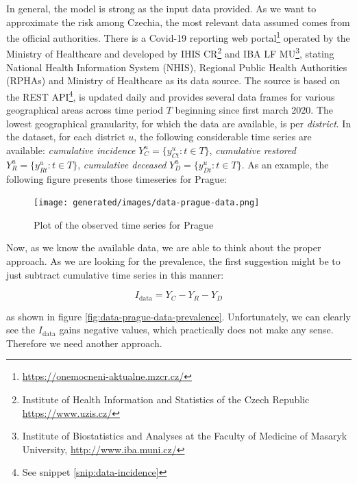 \documentclass[
  digital, %
  oneside, %
  lof,     %
  lot,     %
]{fithesis4}
\begin{document}
In general, the model is strong as the input data provided. As we want to approximate the risk among Czechia, the most relevant data assumed comes from the official authorities.
There is a Covid-19 reporting web portal\footnote{\url{https://onemocneni-aktualne.mzcr.cz/}} operated 
by the Ministry of Healthcare and developed by IHIS CR\footnote{Institute of Health Information and Statistics of the Czech Republic \url{https://www.uzis.cz/}} and IBA LF MU\footnote{Institute of Biostatistics and Analyses at the Faculty of Medicine of Masaryk University, \url{http://www.iba.muni.cz/}}, 
stating National Health Information System (NHIS), Regional Public 
Health Authorities (RPHAs) and Ministry of Healthcare as its 
data source. 
The source is based on the REST API\footnote{See snippet \ref{snip:data-incidence}}, 
is updated daily and provides several data frames for various geographical areas across time period $T$ beginning since first march 2020.
The lowest geographical granularity, for which the data are available, 
is per \textit{district}.
In the dataset, for each district $u$, the following considerable time series are available:
\textit{cumulative incidence} $Y_C^u = \{ y_{Ct}^u : t \in T \}$,
\textit{cumulative restored} $Y_R^u = \{ y_{R t}^u : t \in T \}$,
\textit{cumulative deceased} $Y_D^u = \{ y_{D t}^u : t \in T \}$.
As an example, the following figure presents those timeseries for Prague:

\begin{figure}[H]
  \begin{center}
    \texttt{[image: generated/images/data-prague-data.png]}
  \end{center}
  \caption{Plot of the observed time series for Prague}
  \label{fig:data-prague-data}
\end{figure}

Now, as we know the available data, we are able to think about 
the proper approach.
As we are looking for the prevalence, the first suggestion might be to just subtract cumulative time series in this manner:

\begin{equation}\label{eq:data-prevalence-naive}
  I_{\text{data}} = Y_C - Y_R - Y_D
\end{equation}

as shown in figure \ref{fig:data-prague-data-prevalence}.
Unfortunately, we can clearly see the $I_{\text{data}}$ gains negative values, which practically does not make any sense.
Therefore we need another approach.
\end{document}
